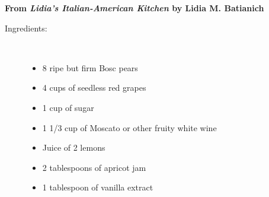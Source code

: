 \documentclass[11pt,letterpaper]{article}
\begin{document}


\begin{flushright}
{\bf From {\it Lidia's Italian-American Kitchen} by Lidia M. Batianich}
\end{flushright}

\begin{description}

\item[Ingredients:]\ \\
	\begin{itemize}
	\item 8 ripe but firm Bosc pears
	\item 4 cups of seedless red grapes
	\item 1 cup of sugar
	\item 1 1/3 cup of Moscato or other fruity white wine
	\item Juice of 2 lemons
	\item 2 tablespoons of apricot jam
	\item 1 tablespoon of vanilla extract
	\end{itemize}


\end{description}
\end{document}
